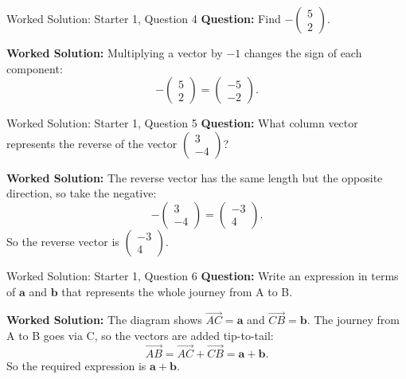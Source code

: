 \documentclass{beamer}
\begin{document}
\begin{frame}{Worked Solution: Starter 1, Question 4}
\textbf{Question:} Find \(-\begin{pmatrix}5\\2\end{pmatrix}\).

\textbf{Worked Solution:}
Multiplying a vector by \(-1\) changes the sign of each component:
\[
-\begin{pmatrix}5\\2\end{pmatrix}
=
\begin{pmatrix}-5\\-2\end{pmatrix}.
\]

\end{frame}

\begin{frame}{Worked Solution: Starter 1, Question 5}
\textbf{Question:} What column vector represents the reverse of the vector \(\begin{pmatrix}3\\-4\end{pmatrix}\)?

\textbf{Worked Solution:}
The reverse vector has the same length but the opposite direction, so take the negative:
\[
-\begin{pmatrix}3\\-4\end{pmatrix}
=
\begin{pmatrix}-3\\4\end{pmatrix}.
\]
So the reverse vector is \(\begin{pmatrix}-3\\4\end{pmatrix}\).

\end{frame}

\begin{frame}{Worked Solution: Starter 1, Question 6}
\textbf{Question:} Write an expression in terms of \(\mathbf{a}\) and \(\mathbf{b}\) that represents the whole journey from A to B.

\textbf{Worked Solution:}
The diagram shows \(\overrightarrow{AC}=\mathbf{a}\) and \(\overrightarrow{CB}=\mathbf{b}\). The journey from A to B goes via C, so the vectors are added tip-to-tail:
\[
\overrightarrow{AB}
=
\overrightarrow{AC}+\overrightarrow{CB}
=
\mathbf{a}+\mathbf{b}.
\]
So the required expression is \(\mathbf{a}+\mathbf{b}\).

\end{frame}
\end{document}
